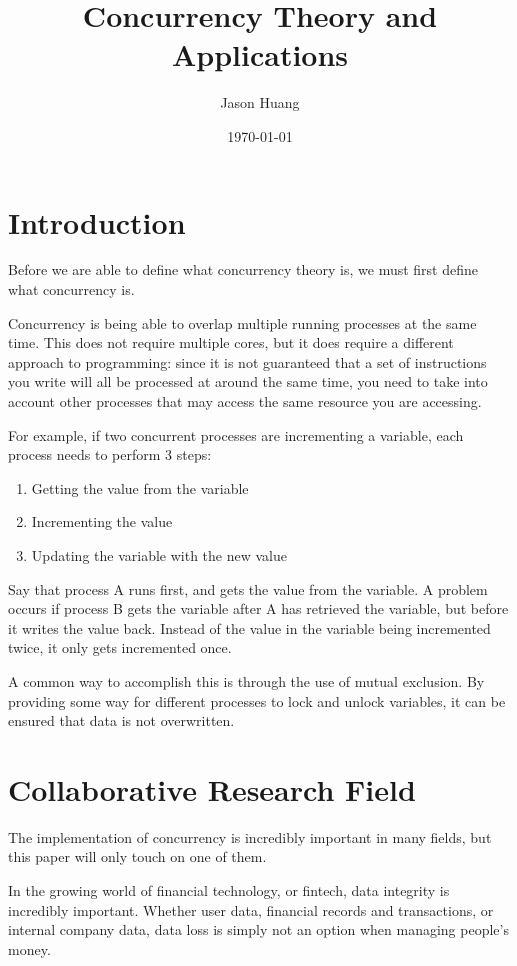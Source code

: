 \documentclass[jou]{apa7}
\title{Concurrency Theory and Applications}
\author{Jason Huang}
\date{\today}
\begin{document}
\maketitle

\section{Introduction}
Before we are able to define what concurrency theory is,
we must first define what concurrency is.

Concurrency is being able to overlap multiple running processes at the same time.
This does not require multiple cores,
but it does require a different approach to programming:
since it is not guaranteed that a set of instructions you write will all be processed at around the same time,
you need to take into account other processes that may access the same resource you are accessing.

For example, if two concurrent processes are incrementing a variable,
each process needs to perform 3 steps:

\begin{enumerate}
  \item Getting the value from the variable
  \item Incrementing the value
  \item Updating the variable with the new value
\end{enumerate}

Say that process A runs first, and gets the value from the variable.
A problem occurs if process B gets the variable after A has retrieved the variable, but before it writes the value back.
Instead of the value in the variable being incremented twice, it only gets incremented once.

A common way to accomplish this is through the use of mutual exclusion.
By providing some way for different processes to lock and unlock variables,
it can be ensured that data is not overwritten.
\autocite{lamportTuringLectureComputer2015}

\section{Collaborative Research Field}
The implementation of concurrency is incredibly important in many fields,
but this paper will only touch on one of them.

In the growing world of financial technology, or fintech,
data integrity is incredibly important.
Whether user data, financial records and transactions, or internal company data,
data loss is simply not an option when managing people's money.
\end{document}
